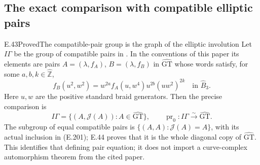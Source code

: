 \subsection{The exact comparison with compatible elliptic pairs}

\begin{result}{E.43}{Proved}{The compatible-pair group is the graph of the elliptic involution}
Let $I\Gamma$ be the group of compatible pairs in
\cite[Definition 5.4 and Proposition--Definition 5.6]{Lochak2025Aut}.
In the conventions of this paper its elements are pairs
$A=(\lambda,f_A)$, $B=(\lambda,f_B)$ in $\widehat{\mathrm{GT}}$
whose words satisfy, for some $a,b,k\in\widehat{\mathbb Z}$,
\[
 f_B(u^2,w^2)=w^{2a}f_A(u,w^4)u^{2b}(uw^2)^{2k}
                   \quad\text{in }\widehat B_3.             \tag{E.200}
\]
Here $u,w$ are the positive standard braid generators.
Then the precise comparison is
\[
 I\Gamma=\{(A,\mathcal J(A)):A\in\widehat{\mathrm{GT}}\},
 \qquad \operatorname{pr}_0:I\Gamma
                    \xrightarrow{\sim}\widehat{\mathrm{GT}}.
                                                               \tag{E.201}
\]
The subgroup of equal compatible pairs is
$\{(A,A):\mathcal J(A)=A\}$, with its actual inclusion in
(E.201); E.44 proves that it is the whole diagonal copy
of $\widehat{\mathrm{GT}}$.  This identifies that defining pair equation; it
does not import a curve-complex automorphism theorem from
the cited paper.
\end{result}
